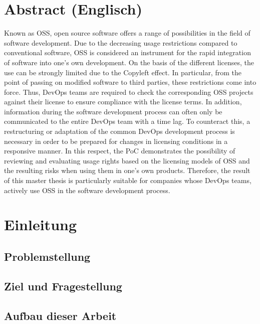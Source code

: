 \documentclass[12pt,titlepage]{report}
\begin{document}
\chapter*{Abstract (Englisch)}
Known as OSS, open source software offers a range of possibilities in the field of software development. Due to the decreasing usage restrictions compared to conventional software, OSS is considered an instrument for the rapid integration of software into one's own development. On the basis of the different licenses, the use can be strongly limited due to the Copyleft effect. In particular, from the point of passing on modified software to third parties, these restrictions come into force. Thus, DevOps teams are required to check the corresponding OSS projects against their license to ensure compliance with the license terms. In addition, information during the software development process can often only be communicated to the entire DevOps team with a time lag. To counteract this, a restructuring or adaptation of the common DevOps development process is necessary in order to be prepared for changes in licensing conditions in a responsive manner. In this respect, the PoC demonstrates the possibility of reviewing and evaluating usage rights based on the licensing models of OSS and the resulting risks when using them in one's own products. Therefore, the result of this master thesis is particularly suitable for companies whose DevOps teams, actively use OSS in the software development process.

\chapter{Einleitung}



\section{Problemstellung}


\section{Ziel und Fragestellung}


\section{Aufbau dieser Arbeit}

\end{document}
